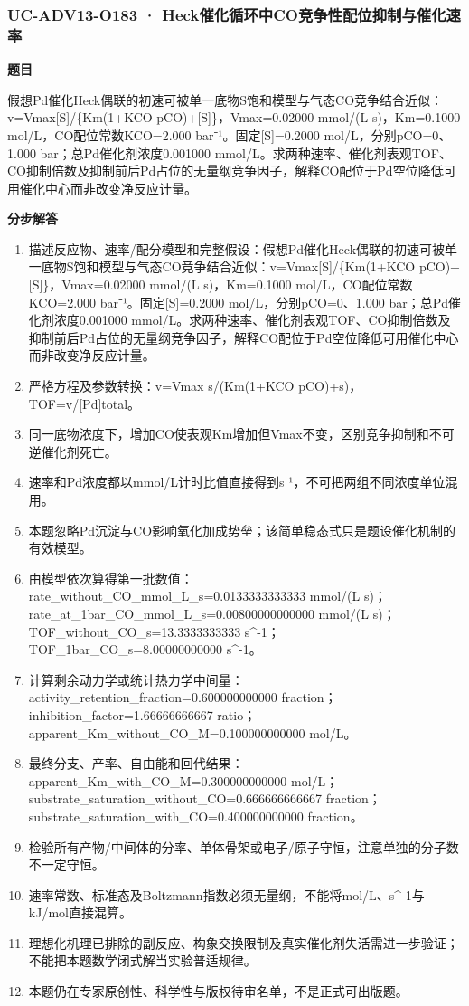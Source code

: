 \documentclass[UTF8,11pt,a4paper]{ctexart}
\begin{document}
\subsubsection*{UC-ADV13-O183 · Heck催化循环中CO竞争性配位抑制与催化速率}
\noindent\textbf{题目}\par
假想Pd催化Heck偶联的初速可被单一底物S饱和模型与气态CO竞争结合近似：v=Vmax[S]/\{Km(1+KCO pCO)+[S]\}，Vmax=0.02000 mmol/(L s)，Km=0.1000 mol/L，CO配位常数KCO=2.000 bar⁻¹。固定[S]=0.2000 mol/L，分别pCO=0、1.000 bar；总Pd催化剂浓度0.001000 mmol/L。求两种速率、催化剂表观TOF、CO抑制倍数及抑制前后Pd占位的无量纲竞争因子，解释CO配位于Pd空位降低可用催化中心而非改变净反应计量。\par
\medskip\noindent\textbf{分步解答}
\begin{enumerate}
\item 描述反应物、速率/配分模型和完整假设：假想Pd催化Heck偶联的初速可被单一底物S饱和模型与气态CO竞争结合近似：v=Vmax[S]/\{Km(1+KCO pCO)+[S]\}，Vmax=0.02000 mmol/(L s)，Km=0.1000 mol/L，CO配位常数KCO=2.000 bar⁻¹。固定[S]=0.2000 mol/L，分别pCO=0、1.000 bar；总Pd催化剂浓度0.001000 mmol/L。求两种速率、催化剂表观TOF、CO抑制倍数及抑制前后Pd占位的无量纲竞争因子，解释CO配位于Pd空位降低可用催化中心而非改变净反应计量。
\item 严格方程及参数转换：v=Vmax s/(Km(1+KCO pCO)+s)，TOF=v/[Pd]total。
\item 同一底物浓度下，增加CO使表观Km增加但Vmax不变，区别竞争抑制和不可逆催化剂死亡。
\item 速率和Pd浓度都以mmol/L计时比值直接得到s⁻¹，不可把两组不同浓度单位混用。
\item 本题忽略Pd沉淀与CO影响氧化加成势垒；该简单稳态式只是题设催化机制的有效模型。
\item 由模型依次算得第一批数值：rate\_without\_CO\_mmol\_L\_s=0.0133333333333 mmol/(L s)；rate\_at\_1bar\_CO\_mmol\_L\_s=0.00800000000000 mmol/(L s)；TOF\_without\_CO\_s=13.3333333333 s\textasciicircum{}-1；TOF\_1bar\_CO\_s=8.00000000000 s\textasciicircum{}-1。
\item 计算剩余动力学或统计热力学中间量：activity\_retention\_fraction=0.600000000000 fraction；inhibition\_factor=1.66666666667 ratio；apparent\_Km\_without\_CO\_M=0.100000000000 mol/L。
\item 最终分支、产率、自由能和回代结果：apparent\_Km\_with\_CO\_M=0.300000000000 mol/L；substrate\_saturation\_without\_CO=0.666666666667 fraction；substrate\_saturation\_with\_CO=0.400000000000 fraction。
\item 检验所有产物/中间体的分率、单体骨架或电子/原子守恒，注意单独的分子数不一定守恒。
\item 速率常数、标准态及Boltzmann指数必须无量纲，不能将mol/L、s\textasciicircum{}-1与kJ/mol直接混算。
\item 理想化机理已排除的副反应、构象交换限制及真实催化剂失活需进一步验证；不能把本题数学闭式解当实验普适规律。
\item 本题仍在专家原创性、科学性与版权待审名单，不是正式可出版题。
\end{enumerate}
\end{document}
